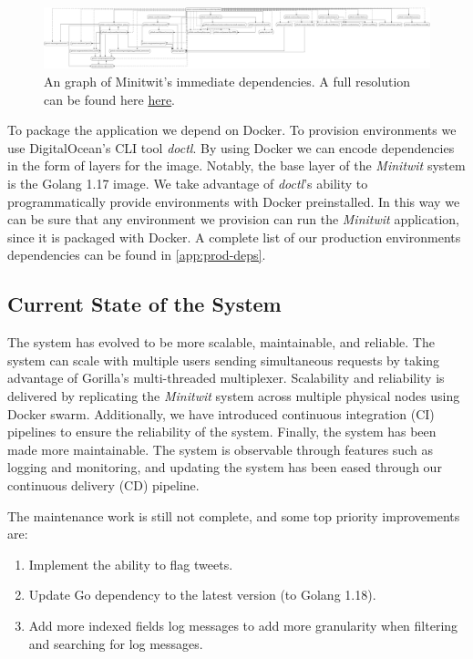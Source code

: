 \begin{figure}
        \centering
        \includegraphics[width=\textwidth]{images/depth-1-deps.jpg}
        \caption{An graph of Minitwit's immediate dependencies. A full resolution can be found here \href{https://raw.githubusercontent.com/antonPalmFolkmann/DevOps2022/main/report/images/depth-1-deps.jpg}{here}.}
        \label{deps:fig:depth1}
\end{figure}

\newpage
To package the application we depend on Docker. To provision environments we use DigitalOcean's CLI tool \textit{doctl}.
By using Docker we can encode dependencies in the form of layers for the image.
Notably, the base layer of the \textit{Minitwit} system is the Golang 1.17 image.
We take advantage of \textit{doctl}'s ability to programmatically provide environments with Docker preinstalled.
In this way we can be sure that any environment we provision can run the \textit{Minitwit} application, since it is packaged with Docker. 
A complete list of our production environments dependencies can be found in \autoref{app:prod-deps}.


\subsection{Current State of the System}
\label{sec:current_state}
The system has evolved to be more scalable, maintainable, and reliable.
The system can scale with multiple users sending simultaneous requests by taking advantage of Gorilla's multi-threaded multiplexer.
Scalability and reliability is delivered by replicating the \textit{Minitwit} system across multiple physical nodes using Docker swarm.
Additionally, we have introduced continuous integration (CI) pipelines to ensure the reliability of the system.
Finally, the system has been made more maintainable.
The system is observable through features such as logging and monitoring, and updating the system has been eased through our continuous delivery (CD) pipeline.

The maintenance work is still not complete, and some top priority improvements are:
\begin{enumerate}
    \item Implement the ability to flag tweets.
    \item Update Go dependency to the latest version (to Golang 1.18).
    \item Add more indexed fields log messages to add more granularity when filtering and searching for log messages.
\end{enumerate}

